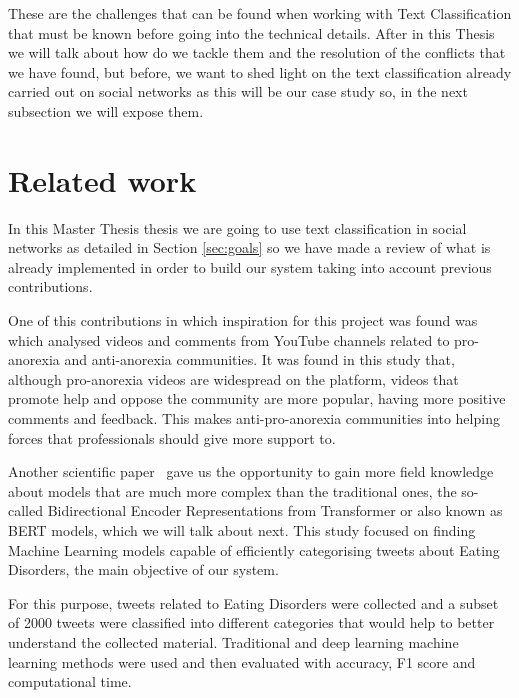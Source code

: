 These are the challenges that can be found when working with Text Classification that must be known before going into the technical details. After in this Thesis we will talk about how do we tackle them and the resolution of the conflicts that we have found, but before, we want to shed light on the text classification already carried out on social networks as this will be our case study so, in the next subsection we will expose them.


\section{Related work}
\label{sec:studies}


In this Master Thesis thesis we are going to use text classification in social networks as detailed in Section \ref{sec:goals} so we have made a review of what is already implemented in order to build our system taking into account previous contributions.

One of this contributions in which inspiration for this project was found was~\cite{oksanen2015pro} which analysed videos and comments from YouTube channels related to pro-anorexia and anti-anorexia communities. It was found in this study that, although pro-anorexia videos are widespread on the platform, videos that promote help and oppose the community are more popular, having more positive comments and feedback. This makes anti-pro-anorexia communities into helping forces that professionals should give more support to.

Another scientific paper~\cite{benitez2022traditional} gave us the opportunity to gain more field knowledge about models that are much more complex than the traditional ones, the so-called Bidirectional Encoder Representations from Transformer or also known as BERT models, which we will talk about next. This study focused on finding Machine Learning models capable of efficiently categorising tweets about Eating Disorders, the main objective of our system.

For this purpose, tweets related to Eating Disorders were collected and a subset of 2000 tweets were classified into different categories that would help to better understand the collected material. Traditional and deep learning machine learning methods were used and then evaluated with accuracy, F1 score and computational time. 

